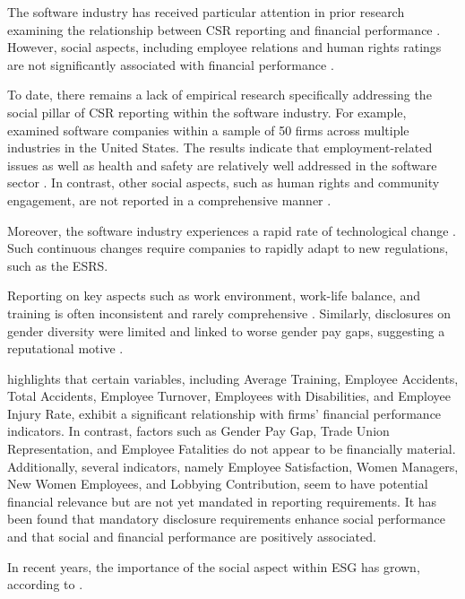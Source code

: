 The software industry has received particular attention in prior research examining the relationship 
between CSR reporting and financial performance \parencite{Okafor2021}.
However, social aspects, including employee relations and human rights ratings are not significantly associated 
with financial performance \parencite{Okafor2021}.

To date, there remains a lack of empirical research specifically addressing the social pillar of CSR reporting 
within the software industry. For example, \textcite{Holder-Webb2009} examined software companies within a sample 
of 50 firms across multiple industries in the United States. The results indicate that employment-related issues 
as well as health and safety are relatively well addressed in the software sector \parencite{Holder-Webb2009}. 
In contrast, other social aspects, such as human rights and community engagement, are not reported in a 
comprehensive manner \parencite{Holder-Webb2009}.

Moreover, the software industry experiences a rapid rate of technological change \parencite{Li2010}.
Such continuous changes require companies to rapidly adapt to new regulations, such as the ESRS. 

Reporting on key aspects such as work environment, work-life balance, 
and training is often inconsistent and rarely comprehensive \parencite{Greig2021}. Similarly,
disclosures on gender diversity were limited and linked to worse gender pay gaps,
suggesting a reputational motive \parencite{Huang2022}.

\textcite{Bornar2025} highlights that certain variables, including Average Training, Employee Accidents, 
Total Accidents, Employee Turnover, Employees with Disabilities, and Employee Injury Rate, exhibit 
a significant relationship with firms' financial performance indicators. In contrast, factors such as Gender Pay Gap, 
Trade Union Representation, and Employee Fatalities do not appear to be financially material. Additionally, 
several indicators, namely Employee Satisfaction, Women Managers, New Women Employees, and Lobbying Contribution, 
seem to have potential financial relevance but are not yet mandated in reporting requirements.
It has been found that mandatory disclosure requirements enhance social performance and that social 
and financial performance are positively associated.

In recent years, the importance of the social aspect within ESG has grown, according to \textcite{BaidJayaraman2022}. 

